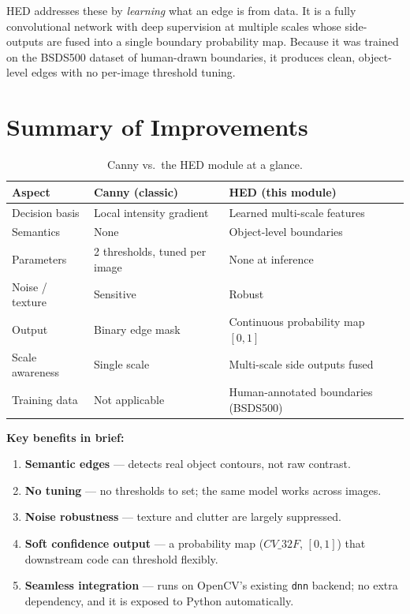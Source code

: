 \documentclass[11pt]{article}
\begin{document}
HED addresses these by \emph{learning} what an edge is from data. It is a fully
convolutional network with deep supervision at multiple scales whose side-outputs
are fused into a single boundary probability map. Because it was trained on the
BSDS500 dataset of human-drawn boundaries, it produces clean, object-level edges
with no per-image threshold tuning.

\section{Summary of Improvements}

\begin{table}[h]
\centering
\begin{tabular}{@{}p{4.2cm}p{4.6cm}p{4.6cm}@{}}
\toprule
\textbf{Aspect} & \textbf{Canny (classic)} & \textbf{HED (this module)} \\
\midrule
Decision basis & Local intensity gradient & Learned multi-scale features \\
Semantics & None & Object-level boundaries \\
Parameters & 2 thresholds, tuned per image & None at inference \\
Noise / texture & Sensitive & Robust \\
Output & Binary edge mask & Continuous probability map $[0,1]$ \\
Scale awareness & Single scale & Multi-scale side outputs fused \\
Training data & Not applicable & Human-annotated boundaries (BSDS500) \\
\bottomrule
\end{tabular}
\caption{Canny vs.\ the HED module at a glance.}
\end{table}

\noindent\textbf{Key benefits in brief:}
\begin{enumerate}[noitemsep]
    \item \textbf{Semantic edges} — detects real object contours, not raw contrast.
    \item \textbf{No tuning} — no thresholds to set; the same model works across images.
    \item \textbf{Noise robustness} — texture and clutter are largely suppressed.
    \item \textbf{Soft confidence output} — a probability map ($CV\_32F$, $[0,1]$)
    that downstream code can threshold flexibly.
    \item \textbf{Seamless integration} — runs on OpenCV's existing \texttt{dnn}
    backend; no extra dependency, and it is exposed to Python automatically.
\end{enumerate}
\end{document}
